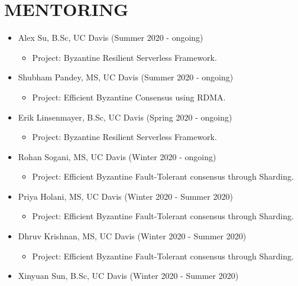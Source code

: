 \documentclass[10pt]{article}
\begin{document}
\section*{MENTORING}
\begin{itemize}
\itemsep-0.2em
\item Alex Su, B.Sc, UC Davis (Summer 2020 - ongoing)
	\begin{itemize}\vspace{-2mm}
	\item Project: Byzantine Resilient Serverless Framework.
	\end{itemize}
\item Shubham Pandey, MS, UC Davis (Summer 2020 - ongoing)
	\begin{itemize}\vspace{-2mm}
	\item Project: Efficient Byzantine Consensus using RDMA.
	\end{itemize}
\item Erik Linsenmayer, B.Sc, UC Davis (Spring 2020 - ongoing)
	\begin{itemize}\vspace{-2mm}
	\item Project: Byzantine Resilient Serverless Framework.
	\end{itemize}
\item Rohan Sogani, MS, UC Davis (Winter 2020 - ongoing)
	\begin{itemize}\vspace{-2mm}
	\item Project: Efficient Byzantine Fault-Tolerant consensus through Sharding.
	\end{itemize}
\item Priya Holani, MS, UC Davis (Winter 2020 - Summer 2020)
	\begin{itemize}\vspace{-2mm}
	\item Project: Efficient Byzantine Fault-Tolerant consensus through Sharding.
	\end{itemize}
\item Dhruv Krishnan, MS, UC Davis (Winter 2020 - Summer 2020)
	\begin{itemize}\vspace{-2mm}
	\item Project: Efficient Byzantine Fault-Tolerant consensus through Sharding.
	\end{itemize}
\item Xinyuan Sun, B.Sc, UC Davis (Winter 2020 - Summer 2020)
	\begin{itemize}\vspace{-2mm}

\end{itemize}
\end{itemize}
\end{document}
